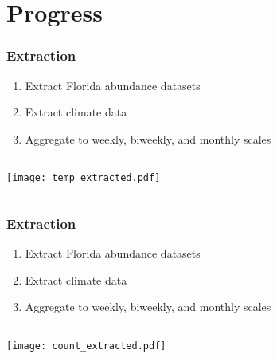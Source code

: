 \documentclass{beamer}
\begin{document}
\section{Progress}

\begin{frame}
\frametitle{Extraction}

\begin{enumerate}
	\item Extract Florida abundance datasets 
	
	\item Extract climate data 
	
	\item Aggregate to weekly, biweekly, and monthly scales	
\end{enumerate}
	

\vspace{0.7cm}
\begin{columns}
	\begin{column}{0.7\textwidth}
		\texttt{[image: temp\_extracted.pdf]}
	\end{column}
	\begin{column}{0.3\textwidth}
		
	\end{column}
\end{columns}

\end{frame}

\begin{frame}
\frametitle{Extraction}

\begin{enumerate}
	\item Extract Florida abundance datasets 
	
	\item Extract climate data 
	
	\item Aggregate to weekly, biweekly, and monthly scales	
\end{enumerate}


\vspace{0.7cm}
\begin{columns}
	\begin{column}{0.7\textwidth}
		\texttt{[image: count\_extracted.pdf]}
	\end{column}
	\begin{column}{0.3\textwidth}
		
	\end{column}
\end{columns}

\end{frame}
\end{document}
